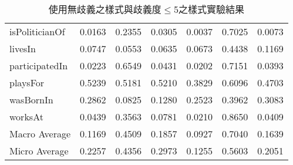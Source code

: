 \begin{table}
\begin{center}
\begin{tabular}{|l||c|c|c||c|c|c|}
        isPoliticianOf & 0.0163 & 0.2355 & 0.0305 & 0.0037 & 0.7025 & 0.0073 \\
        livesIn & 0.0747 & 0.0553 & 0.0635 & 0.0673 & 0.4438 & 0.1169 \\
        participatedIn & 0.0223 & 0.6549 & 0.0431 & 0.0202 & 0.7151 & 0.0393 \\
        playsFor & 0.5239 & 0.5181 & 0.5210 & 0.3829 & 0.6096 & 0.4703 \\
        wasBornIn & 0.2862 & 0.0825 & 0.1280 & 0.2523 & 0.3962 & 0.3083 \\
        worksAt & 0.0439 & 0.3563 & 0.0781 & 0.0210 & 0.8650 & 0.0409 \\ 
        \hline
        Macro Average & 0.1169 & 0.4509 & 0.1857 & 0.0927 & 0.7040 & 0.1639 \\
        Micro Average & 0.2257 & 0.4356 & 0.2973 & 0.1255 & 0.5603 & 0.2051 \\
        \hline
        \end{tabular}
        \caption{使用無歧義之樣式與歧義度$\leq$5之樣式實驗結果}
        \label{t:baseline-1}
    \end{center}
\end{table}
